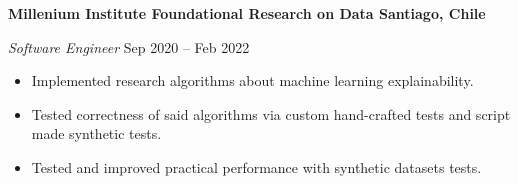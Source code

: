 \documentclass[../main.tex]{subfiles}
\begin{document}
    \textbf{Millenium Institute Foundational Research on Data \hfill  Santiago, Chile} \par
    \textit{Software Engineer} \hfill Sep 2020 -- Feb 2022 \par
    \begin{itemize}
        \item Implemented research algorithms about machine learning explainability.
        \item Tested correctness of said algorithms via custom hand-crafted tests and script made synthetic tests.
        \item Tested and improved practical performance with synthetic datasets tests. 
\end{itemize} \par
\end{document}
